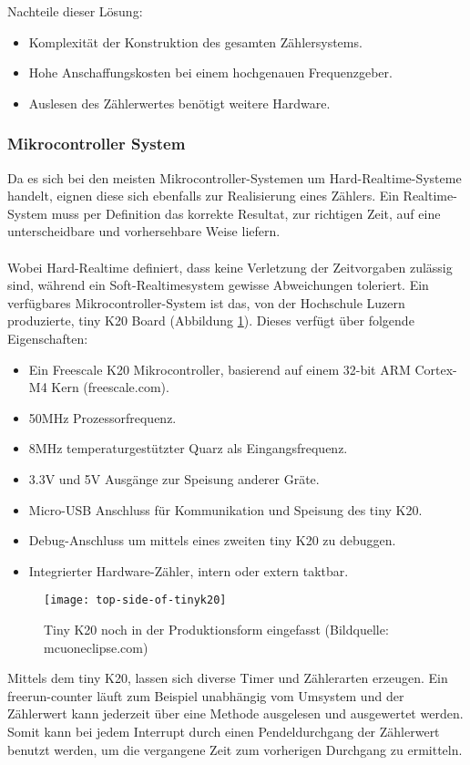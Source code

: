     Nachteile dieser Lösung:
    \begin{itemize}
    	\item Komplexität der Konstruktion des gesamten Zählersystems.
    	\item Hohe Anschaffungskosten bei einem hochgenauen Frequenzgeber.
    	\item Auslesen des Zählerwertes benötigt weitere Hardware.
    \end{itemize}
	\subsubsection{Mikrocontroller System}
   		Da es sich bei den meisten Mikrocontroller-Systemen um Hard-Realtime-Systeme handelt, eignen diese sich ebenfalls zur Realisierung eines Zählers. Ein Realtime-System muss per Definition das korrekte Resultat, zur richtigen Zeit, auf eine unterscheidbare und vorhersehbare Weise liefern.\\
           \\
		Wobei Hard-Realtime definiert, dass keine Verletzung der Zeitvorgaben zulässig sind, während ein Soft-Realtimesystem gewisse Abweichungen toleriert. Ein verfügbares Mikrocontroller-System ist das, von der Hochschule Luzern produzierte, tiny K20 Board (Abbildung \ref{fig:TinyK20}). Dieses verfügt über folgende Eigenschaften:
		\begin{itemize}
			\item Ein Freescale K20 Mikrocontroller, basierend auf einem  32-bit ARM Cortex-M4 Kern (freescale.com).
			\item 50MHz Prozessorfrequenz.
			\item 8MHz temperaturgestützter Quarz als Eingangsfrequenz.
			\item 3.3V und 5V Ausgänge zur Speisung anderer Gräte.
			\item Micro-USB Anschluss für Kommunikation und Speisung des tiny K20.
			\item Debug-Anschluss um mittels eines zweiten tiny K20 zu debuggen.
			\item Integrierter Hardware-Zähler, intern oder extern taktbar.
		\end{itemize}
		\begin{figure}[H]
        	\centering
        	\texttt{[image: top-side-of-tinyk20]}
        	\caption{Tiny K20 noch in der Produktionsform eingefasst (Bildquelle: mcuoneclipse.com)}
        	\label{fig:TinyK20}
    	\end{figure}
    	Mittels dem tiny K20, lassen sich diverse Timer und Zählerarten erzeugen. Ein \glqq{}freerun-counter\grqq{} läuft zum Beispiel unabhängig vom Umsystem und der Zählerwert kann jederzeit über eine Methode ausgelesen und ausgewertet werden. Somit kann bei jedem Interrupt durch einen Pendeldurchgang der Zählerwert benutzt werden, um die vergangene Zeit zum vorherigen Durchgang zu ermitteln. 
